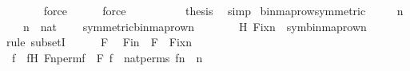 \begin{isabellebody}
\ \ \ \ \ \isamarkupfalse%
\ force\isanewline
\ \ \ \ \isamarkupfalse%
\ force\isanewline
\ \ \ \ \isamarkupfalse%
\isanewline
\ \ \isamarkupfalse%
\ \isamarkupfalse%
\ {\isacharquery}{\kern0pt}thesis\ \isamarkupfalse%
\ simp\isanewline
{}\isamarkupfalse%
%
\endisatagproof
{\isafoldproof}%
%
\isadelimproof
\isanewline
%
\endisadelimproof
\isanewline
{}\isamarkupfalse%
\ binmap{\isacharunderscore}{\kern0pt}row{\isacharprime}{\kern0pt}{\isacharunderscore}{\kern0pt}symmetric\ {\isacharcolon}{\kern0pt}\ \isanewline
\ \ \ n\ \isanewline
\ \ \ {\isachardoublequoteopen}n\ {\isasymin}\ nat{\isachardoublequoteclose}\ \isanewline
\ \ \ {\isachardoublequoteopen}symmetric{\isacharparenleft}{\kern0pt}binmap{\isacharunderscore}{\kern0pt}row{\isacharprime}{\kern0pt}{\isacharparenleft}{\kern0pt}n{\isacharparenright}{\kern0pt}{\isacharparenright}{\kern0pt}{\isachardoublequoteclose}\ \isanewline
%
\isadelimproof
%
\endisadelimproof
%
\isatagproof
{}\isamarkupfalse%
\ {\isacharminus}{\kern0pt}\ \isanewline
\ \ \isamarkupfalse%
\ H{\isacharcolon}{\kern0pt}\ {\isachardoublequoteopen}Fix{\isacharparenleft}{\kern0pt}{\isacharbraceleft}{\kern0pt}n{\isacharbraceright}{\kern0pt}{\isacharparenright}{\kern0pt}\ {\isasymsubseteq}\ sym{\isacharparenleft}{\kern0pt}binmap{\isacharunderscore}{\kern0pt}row{\isacharprime}{\kern0pt}{\isacharparenleft}{\kern0pt}n{\isacharparenright}{\kern0pt}{\isacharparenright}{\kern0pt}{\isachardoublequoteclose}\ \isanewline
\ \ \isamarkupfalse%
{\isacharparenleft}{\kern0pt}rule\ subsetI{\isacharparenright}{\kern0pt}\isanewline
\ \ \ \ \isamarkupfalse%
\ F\ \isamarkupfalse%
\ Fin\ {\isacharcolon}{\kern0pt}\ {\isachardoublequoteopen}F\ {\isasymin}\ Fix{\isacharparenleft}{\kern0pt}{\isacharbraceleft}{\kern0pt}n{\isacharbraceright}{\kern0pt}{\isacharparenright}{\kern0pt}{\isachardoublequoteclose}\ \isanewline
\ \ \ \ \isamarkupfalse%
\ \isamarkupfalse%
\ f\ \ fH{\isacharcolon}{\kern0pt}\ {\isachardoublequoteopen}Fn{\isacharunderscore}{\kern0pt}perm{\isacharprime}{\kern0pt}{\isacharparenleft}{\kern0pt}f{\isacharparenright}{\kern0pt}\ {\isacharequal}{\kern0pt}\ F{\isachardoublequoteclose}\ {\isachardoublequoteopen}f\ {\isasymin}\ nat{\isacharunderscore}{\kern0pt}perms{\isachardoublequoteclose}\ {\isachardoublequoteopen}f{\isacharbackquote}{\kern0pt}n\ {\isacharequal}{\kern0pt}\ n{\isachardoublequoteclose}\ \isanewline

\end{isabellebody}
